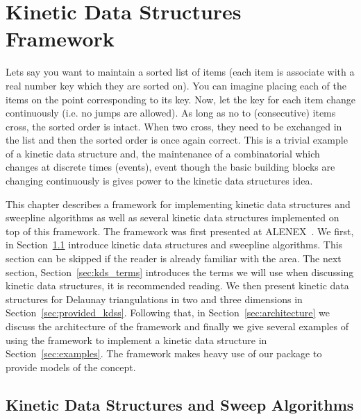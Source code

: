 
\chapter{Kinetic Data Structures Framework}
\label{chapter-kds}
\minitoc




\def\note#1{$\langle\langle${\bf #1}$\rangle\rangle$}




Lets say you want to maintain a sorted list of items (each item is
associate with a real number key which they are sorted on). You can
imagine placing each of the items on the point corresponding to its
key. Now, let the key for each item change continuously (i.e. no jumps
are allowed). As long as no to (consecutive) items cross, the sorted
order is intact. When two cross, they need to be exchanged in the list
and then the sorted order is once again correct. This is a trivial
example of a kinetic data structure and, the maintenance of a
combinatorial which changes at discrete times (events), event though
the basic building blocks are changing continuously is gives power to
the kinetic data structures idea.

This chapter describes a framework for implementing kinetic data
structures and sweepline algorithms as well as several kinetic data
structures implemented on top of this framework. The framework was
first presented at ALENEX~\cite{gkr-cfhm-04}. We first, in
Section~\ref{sec:kds_intro} introduce kinetic data structures and
sweepline algorithms. This section can be skipped if the reader is
already familiar with the area. The next section,
Section~\ref{sec:kds_terms} introduces the terms we will use when
discussing kinetic data structures, it is recommended reading. We then
present kinetic data structures for Delaunay triangulations in two and
three dimensions in Section~\ref{sec:provided_kdss}. Following that,
in Section~\ref{sec:architecture} we discuss the architecture of the
framework and finally we give several examples of using the framework
to implement a kinetic data structure in
Section~\ref{sec:examples}. The framework makes heavy use of our
 package to provide models of the 
concept.

\section{Kinetic Data Structures and Sweep Algorithms}
\label{sec:kds_intro}


